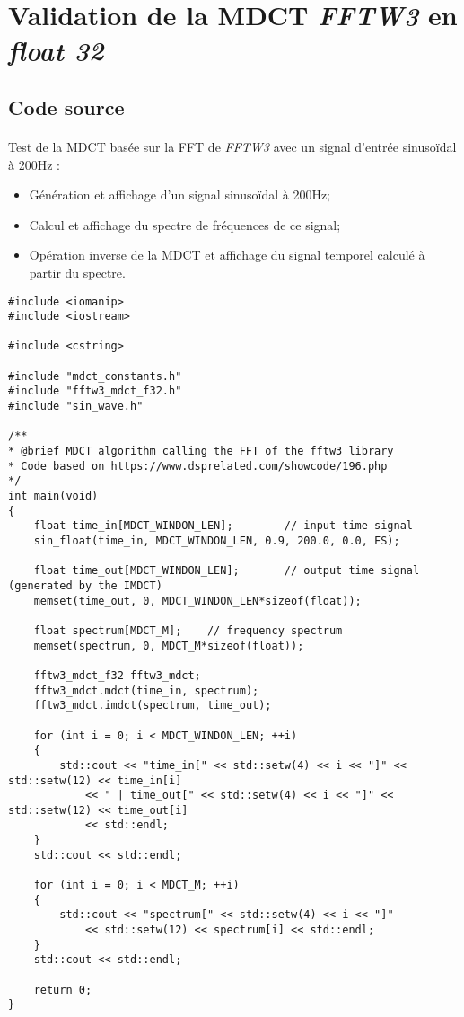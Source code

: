 \documentclass{article}
\begin{document}

\newpage
\section{Validation de la MDCT \emph{FFTW3} en \emph{float 32}}\label{app:fftw3_example}
\subsection{Code source}\label{app:fftw3_example_code}
\paragraph{}
Test de la MDCT basée sur la FFT de \emph{FFTW3} avec un signal d'entrée sinusoïdal à 200Hz :
\begin{itemize}
    \item Génération et affichage d'un signal sinusoïdal à 200Hz;
    \item Calcul et affichage du spectre de fréquences de ce signal;
    \item Opération inverse de la MDCT et affichage du signal temporel calculé à partir du spectre.
\end{itemize}
\lstset{language=C++}
\begin{lstlisting}
#include <iomanip>
#include <iostream>

#include <cstring>

#include "mdct_constants.h"
#include "fftw3_mdct_f32.h"
#include "sin_wave.h"

/**
* @brief MDCT algorithm calling the FFT of the fftw3 library
* Code based on https://www.dsprelated.com/showcode/196.php
*/
int main(void)
{
    float time_in[MDCT_WINDON_LEN];        // input time signal
    sin_float(time_in, MDCT_WINDON_LEN, 0.9, 200.0, 0.0, FS);

    float time_out[MDCT_WINDON_LEN];       // output time signal (generated by the IMDCT)
    memset(time_out, 0, MDCT_WINDON_LEN*sizeof(float));

    float spectrum[MDCT_M];    // frequency spectrum
    memset(spectrum, 0, MDCT_M*sizeof(float));

    fftw3_mdct_f32 fftw3_mdct;
    fftw3_mdct.mdct(time_in, spectrum);
    fftw3_mdct.imdct(spectrum, time_out);

    for (int i = 0; i < MDCT_WINDON_LEN; ++i)
    {
        std::cout << "time_in[" << std::setw(4) << i << "]" << std::setw(12) << time_in[i]
            << " | time_out[" << std::setw(4) << i << "]" << std::setw(12) << time_out[i]
            << std::endl;
    }
    std::cout << std::endl;

    for (int i = 0; i < MDCT_M; ++i)
    {
        std::cout << "spectrum[" << std::setw(4) << i << "]"
            << std::setw(12) << spectrum[i] << std::endl;
    }
    std::cout << std::endl;

    return 0;
}
\end{lstlisting}
\end{document}

